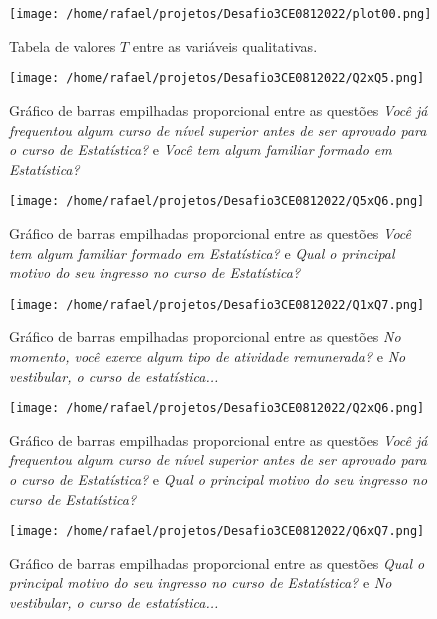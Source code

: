 \documentclass[
		a4paper,
		11pt,
		extrafontsizes,
		oneside,
		onecolumn,
		openright,
		final,
		article,
		brazil,
		sumario=tradicional
]{abntex2}
\begin{document}
\begin{figure}[htp]
\centering
\texttt{[image: /home/rafael/projetos/Desafio3CE0812022/plot00.png]}
\caption{Tabela de valores $T$ entre as variáveis qualitativas. }
\label{tabela}
\end{figure}

\begin{figure}[htp]
\centering
\texttt{[image: /home/rafael/projetos/Desafio3CE0812022/Q2xQ5.png]}
\caption{Gráfico de barras empilhadas proporcional entre as questões \emph{Você já frequentou algum curso de nível superior antes de ser aprovado para o curso de Estatística?} e \emph{Você tem algum familiar formado em Estatística?}}
\label{Q2xQ5}
\end{figure}

\begin{figure}[htp]
\centering
\texttt{[image: /home/rafael/projetos/Desafio3CE0812022/Q5xQ6.png]}
\caption{Gráfico de barras empilhadas proporcional entre as questões \emph{Você tem algum familiar formado em Estatística?} e \emph{Qual o principal motivo do seu ingresso no curso de Estatística?}}
\label{Q5xQ6}
\end{figure}

\begin{figure}[htp]
\centering
\texttt{[image: /home/rafael/projetos/Desafio3CE0812022/Q1xQ7.png]}
\caption{Gráfico de barras empilhadas proporcional entre as questões \emph{No momento, você exerce algum tipo de atividade remunerada?} e \emph{No vestibular, o curso de estatística...}}
\label{Q1xQ7}
\end{figure}

\begin{figure}[htp]
\centering
\texttt{[image: /home/rafael/projetos/Desafio3CE0812022/Q2xQ6.png]}
\caption{Gráfico de barras empilhadas proporcional entre as questões \emph{Você já frequentou algum curso de nível superior antes de ser aprovado para o curso de Estatística?} e \emph{Qual o principal motivo do seu ingresso no curso de Estatística?}}
\label{Q2xQ6}
\end{figure}

\begin{figure}[htp]
\centering
\texttt{[image: /home/rafael/projetos/Desafio3CE0812022/Q6xQ7.png]}
\caption{Gráfico de barras empilhadas proporcional entre as questões \emph{Qual o principal motivo do seu ingresso no curso de Estatística?} e \emph{No vestibular, o curso de estatística...}}
\label{Q6xQ7}
\end{figure}
\end{document}
